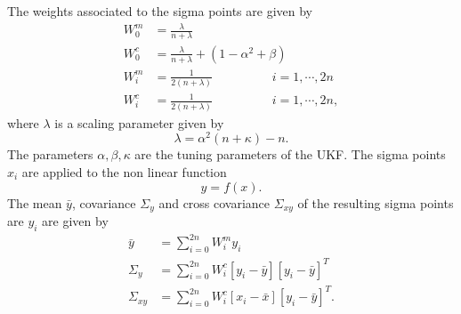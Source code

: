 The weights associated to the sigma points are given by 
\begin{equation}
    \label{eq:ut_weights}
    \begin{split}
    W_0^m &= \frac{\lambda}{n+\lambda} \\
    W_0^c &= \frac{\lambda}{n+\lambda} + ( 1 - \alpha^2 + \beta)\\
    W_i^m &= \frac{1}{2(n+\lambda)} \hspace{2cm} i = 1, \cdots, 2n \\
    W_i^c &= \frac{1}{2(n+\lambda)} \hspace{2cm} i = 1, \cdots, 2n ,
    \end{split}
\end{equation} 
where $\lambda$ is a scaling parameter given by $$ \lambda = \alpha^2(n+\kappa)-n. $$ The parameters $\alpha,\beta,\kappa$ are the tuning parameters of the UKF.
The sigma points $x_i$ are applied to the non linear function $$y= f(x).$$ The mean $\bar y$, covariance $\Sigma_y$ and cross covariance $\Sigma_{xy}$ of the resulting sigma points are $y_i$ are given by
\begin{equation}
    \label{eq:ut_mean_cov}
    \begin{split}
        \bar y &= \sum \limits_{i=0}^{2n} W_i^m y_i \\
        \Sigma_y &= \sum \limits_{i=0}^{2n} W_i^c [y_i - \bar y ] [ y_i - \bar y] ^T \\
        \Sigma_{xy} &= \sum \limits_{i=0}^{2n} W_i^c [x_i - \bar x ] [ y_i - \bar y] ^T .
    \end{split}
\end{equation}

